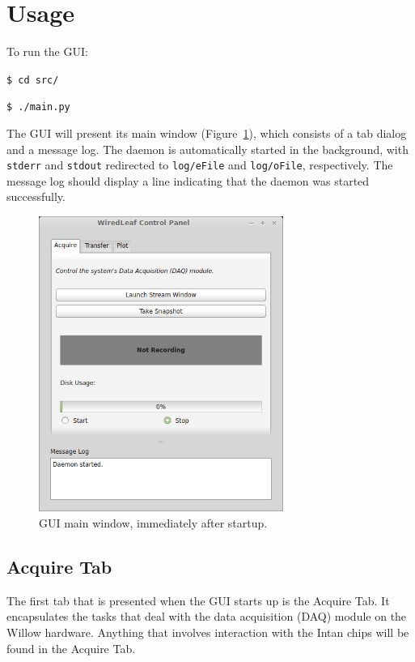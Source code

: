 
\section{Usage}
\label{sec_usage}

To run the GUI:

\vspace{5mm}
\texttt{\$ cd src/}

\texttt{\$ ./main.py}
\vspace{5mm}

\noindent
The GUI will present its main window (Figure~\ref{fig_mainwindow}), which consists of a tab dialog and a message log. The daemon is automatically started in the background, with \texttt{stderr} and \texttt{stdout} redirected to \texttt{log/eFile} and \texttt{log/oFile}, respectively. The message log should display a line indicating that the daemon was started successfully.

\begin{figure}[h!]
\begin{center}
\includegraphics[width=8cm]{screenshots/mainwindow.png}
\end{center}
\caption{GUI main window, immediately after startup.}
\label{fig_mainwindow}
\end{figure}

\subsection{Acquire Tab}
\label{sec_usage_acquire}

The first tab that is presented when the GUI starts up is the Acquire Tab. It encapsulates the tasks that deal with the data acquisition (DAQ) module on the Willow hardware. Anything that involves interaction with the Intan chips will be found in the Acquire Tab.


